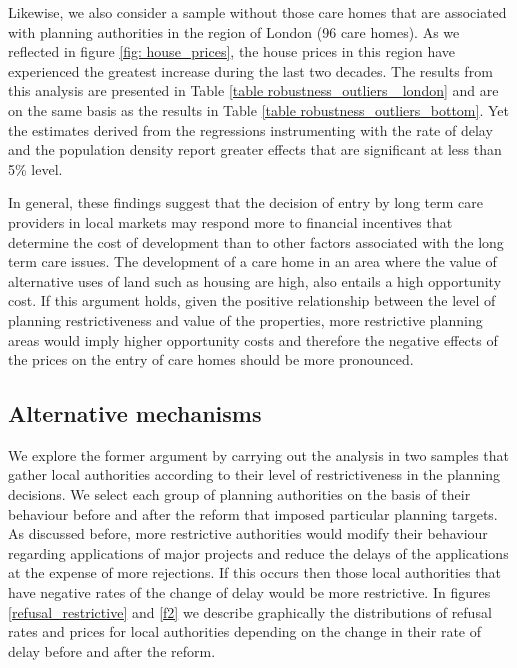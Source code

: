 \documentclass[12pt,letterpaper]{article}
\begin{document}
 Likewise, we also consider a sample without those care homes that are associated with 
 planning authorities in the region of London (96 care homes). As we reflected in figure \ref{fig: house_prices}, the 
 house prices in this region have experienced the greatest increase during the 
 last two decades. The results from this analysis are presented in Table \ref{table robustness_outliers_ london} 
   and are on the same basis 
 as the results in Table \ref{table robustness_outliers_bottom}. Yet the estimates
 derived from the regressions instrumenting with the rate of delay and the population density 
 report greater effects that are significant at less than 5\% level. 
   
      {}
   


In general, these findings suggest that the decision of entry by long term care providers 
in local markets may respond more to financial incentives that determine the cost of
development than to other factors associated with the long term care issues. The development of
 a care home in an area where the value of alternative uses of land such as housing are high, also entails a high opportunity 
cost. If this argument holds, given the positive relationship between the level of planning 
restrictiveness and value of the properties, more restrictive planning areas would imply higher 
opportunity costs and therefore the negative effects of the prices on the entry 
of care homes should be more pronounced. 

\subsection{Alternative mechanisms}

We explore the former argument by carrying out the analysis in two samples that gather 
local authorities according to their level of restrictiveness in the planning 
decisions. We select each group of planning authorities on the basis of their behaviour before and 
after the reform that imposed particular planning targets. As discussed before, more restrictive authorities would
modify their behaviour regarding applications of major projects and reduce the delays 
of the applications at the expense of more rejections. If this occurs then those 
local authorities that have negative rates of the change of delay would be more 
restrictive. In figures \ref{refusal_restrictive} and \ref{f2} we describe graphically the distributions of refusal 
rates and prices for local authorities depending on 
the change in their rate of delay before and after the reform. 
\end{document}
